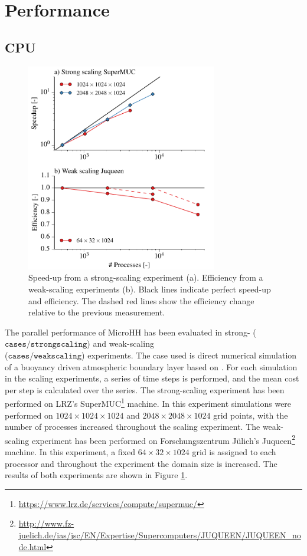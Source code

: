 \documentclass[gmd,manuscript]{copernicus}
\begin{document}
\section{Performance}\label{sec:performance}
\subsection{CPU}
\begin{figure}[!hbt]
	\vspace*{2mm}
	\begin{center}
		\includegraphics[width=8.3cm]{figs/scaling.pdf}
	\end{center}
	\caption{Speed-up from a strong-scaling experiment (a). Efficiency from a weak-scaling experiments (b). Black lines indicate perfect speed-up and efficiency. The dashed red lines show the efficiency change relative to the previous measurement.}\label{fig:scaling}
\end{figure}
The parallel performance of MicroHH has been evaluated in strong- ($\texttt{cases/strongscaling}$) and weak-scaling\\ ($\texttt{cases/weakscaling}$) experiments. The case used is direct numerical simulation of a buoyancy driven atmospheric boundary layer based on \citet{vanHeerwaarden2014}. For each simulation in the scaling experiments, a series of time steps is performed, and the mean cost per step is calculated over the series. The strong-scaling experiment has been performed on LRZ's SuperMUC\footnote{\url{https://www.lrz.de/services/compute/supermuc/}} machine. In this experiment simulations were performed on $1024 \times 1024 \times 1024$ and $2048 \times 2048 \times 1024$ grid points, with the number of processes increased throughout the scaling experiment. The weak-scaling experiment has been performed on Forschungszentrum J\"{u}lich's Juqueen\footnote{\url{http://www.fz-juelich.de/ias/jsc/EN/Expertise/Supercomputers/JUQUEEN/JUQUEEN_node.html}} machine. In this experiment, a fixed $64 \times 32 \times 1024$ grid is assigned to each processor and throughout the experiment the domain size is increased. The results of both experiments are shown in Figure \ref{fig:scaling}.
\end{document}
